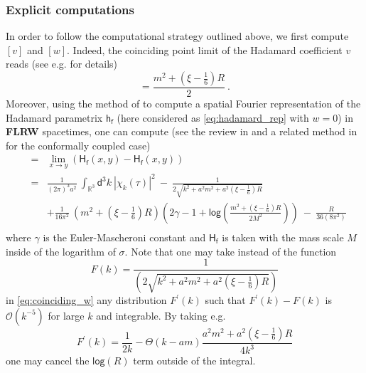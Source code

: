 \documentclass[11pt]{book}
\renewcommand{\log}{\mathsf{log}}
\newcommand{\abs}[1]{\left|#1\right|}
\newcommand{\Ocal}{\mathcal{O}}
\newcommand{\Rbb}{\mathbb{R}}
\newcommand{\Hsf}{\mathsf{H}}
\newcommand{\dsf}{\mathsf{d}}
\newcommand{\fsf}{\mathsf{f}}
\newcommand{\hsf}{\mathsf{h}}
\theoremstyle{break}
\begin{document}
\subsubsection{Explicit computations}


In order to follow the computational strategy outlined above, we first compute $[v]$ and $[w]$.  Indeed, the coinciding point limit of the Hadamard coefficient $v$ reads (see e.g. \cite[Section III.1.2]{HACK_2010} for details)
%
\begin{equation*}
[v]=\frac{m^2+\left(\xi-\frac16\right)R}{2} \ .
\label{eq:coinciding_v}
\end{equation*}
%
Moreover, using the method of \cite{schlemmer_2010} to compute a spatial Fourier representation of the Hadamard parametrix $\hsf_\fsf$ (here considered as \eqref{eq:hadamard_rep} with $w=0$) in \textbf{FLRW} spacetimes, one can compute (see the review in \cite{degner_2013} and a related method in \cite{PINAMONTI_2011} for the conformally coupled case)
%
\begin{eqnarray}
[w] &=& \lim_{x\to y} \left(\Hsf_\fsf(x,y) - \Hsf_\fsf(x,y) \right) \nonumber \\
&=& \frac{1}{(2\pi)^3 a^2} \ \int_{\Rbb^3} \dsf^3k \ \abs{\chi_k(\tau)}^2 \ - \ \frac{1}{2\sqrt{k^2+a^2m^2+a^2\left(\xi-\frac16\right)R}} \nonumber \\
%
&& + \frac{1}{16\pi^2} \ \left(m^2+\left(\xi-\frac16\right)R\right)\left(2\gamma-1+\log\left(
\frac{m^2+\left(\xi-\frac16\right)R}{2M^2}\right)\right) \ - \ \frac{R}{36(8\pi^2)} \nonumber \\
\label{eq:coinciding_w} 
\end{eqnarray}
%
where $\gamma$ is the Euler-Mascheroni constant and $\Hsf_\fsf$ is taken with the mass scale $M$ inside of the logarithm of $\sigma$. Note that one may take instead of the function 
%
\begin{equation*}
F(k) = \frac{1}{(2\sqrt{k^2+a^2m^2+a^2\left(\xi-\frac16\right)R})}
\end{equation*}
%
in \eqref{eq:coinciding_w} any distribution $F^\prime(k)$ such that $F^\prime(k)-F(k)$ is $\Ocal(k^{-5})$ for large $k$ and integrable. By taking e.g. 
%
\begin{equation*}
F^\prime(k) = \frac{1}{2k} - \Theta(k-am)\frac{a^2 m^2 + a^2 \left( \xi - \frac16 \right) R}{4k^3}
\end{equation*}
%
one may cancel the $\log\left(R\right)$ term outside of the integral.
\end{document}
